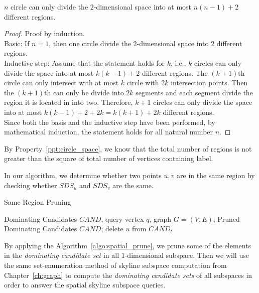 \begin{property}
\label{ppt:circle_space}
$n$ circle can only divide the $2$-dimensional space into at most $n(n-1)+2$ different regions.
\end{property}

\begin{proof}
Proof by induction.\\
Basic: If $n=1$, then one circle divide the $2$-dimensional space into $2$ different regions.\\
Inductive step: Assume that the statement holds for $k$, i.e., $k$ circles can only divide the space into at most $k(k-1)+2$ different regions. The $(k+1)$th circle can only intersect with at most $k$ circle with $2k$ intersection points. Then the $(k+1)$th can only be divide into $2k$ segments and each segment divide the region it is located in into two. Therefore, $k+1$ circles can only divide the space into at most $k(k-1)+2+2k = k(k+1)+2k$ different regions.\\
Since both the basis and the inductive step have been performed, by mathematical induction, the statement holds for all natural number $n$.
\end{proof}

By Property~\ref{ppt:circle_space}, we know that the total number of regions is not greater than the square of total number of vertices containing label. 

In our algorithm, we determine whether two points $u, v$ are in the same region by checking whether $SDS_u$ and $SDS_v$ are the same.

\begin{algorithm}[H]
  \caption{Same Region Pruning}
  \label{algo:spatial_prune}
  \begin{algorithmic}[1]
  \show\LOOP
    \REQUIRE Dominating Candidates $\mathit{CAND}$, query vertex $q$, graph $G=(V, E)$;
    \ENSURE Pruned Dominating Candidates $CAND$;
                \STATE delete $u$ from $\mathit{CAND}_l$
            \ENDIF
        \ENDFOR
    \ENDFOR
  \end{algorithmic}
\end{algorithm}

By applying the Algorithm~\ref{algo:spatial_prune}, we prune some of the elements in the \emph{dominating candidate set} in all $1$-dimensional subspace. Then we will use the same set-enumeration method of skyline subspace computation from Chapter~\ref{ch:graph} to compute the \emph{dominating candidate sets} of all subspaces in order to answer the spatial skyline subspace queries.
